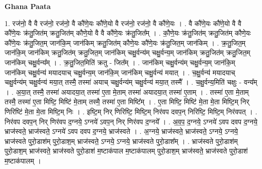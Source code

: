 \documentclass[17pt]{extarticle}
\begin{document}
\textbf{Ghana Paata } \newline

1. रज॑नो॒ वै वै रज॑नो॒ रज॑नो॒ वै कौ॑णे॒यः कौ॑णे॒यो वै रज॑नो॒ रज॑नो॒ वै कौ॑णे॒यः । . वै कौ॑णे॒यः कौ॑णे॒यो वै वै कौ॑णे॒यः क्र॑तु॒जित॑म् क्रतु॒जित॑म् कौणे॒यो वै वै कौ॑णे॒यः क्र॑तु॒जित᳚म् । . कौ॒णे॒यः क्र॑तु॒जित॑म् क्रतु॒जित॑म् कौणे॒यः कौ॑णे॒यः क्र॑तु॒जित॒म् जान॑कि॒म् जान॑किम् क्रतु॒जित॑म् कौणे॒यः कौ॑णे॒यः क्र॑तु॒जित॒म् जान॑किम् । . क्र॒तु॒जित॒म् जान॑कि॒म् जान॑किम् क्रतु॒जित॑म् क्रतु॒जित॒म् जान॑किम् चक्षु॒र्वन्य॑म् चक्षु॒र्वन्य॒म् जान॑किम् क्रतु॒जित॑म् क्रतु॒जित॒म् जान॑किम् चक्षु॒र्वन्य᳚म् । . क्र॒तु॒जित॒मिति॑ क्रतु - जित᳚म् । . जान॑किम् चक्षु॒र्वन्य॑म् चक्षु॒र्वन्य॒म् जान॑कि॒म् जान॑किम् चक्षु॒र्वन्य॑ मयादयाच् चक्षु॒र्वन्य॒म् जान॑कि॒म् जान॑किम् चक्षु॒र्वन्य॑ मयात् । . च॒क्षु॒र्वन्य॑ मयादयाच् चक्षु॒र्वन्य॑म् चक्षु॒र्वन्य॑ मया॒त् तस्मै॒ तस्मा॑ अयाच् चक्षु॒र्वन्य॑म् चक्षु॒र्वन्य॑ मया॒त् तस्मै᳚ । . च॒क्षु॒र्वन्य॒मिति॑ चक्षुः - वन्य᳚म् । . अ॒या॒त् तस्मै॒ तस्मा॑ अयादया॒त् तस्मा॑ ए॒ता मे॒ताम् तस्मा॑ अयादया॒त् तस्मा॑ ए॒ताम् । . तस्मा॑ ए॒ता मे॒ताम् तस्मै॒ तस्मा॑ ए॒ता मिष्टि॒ मिष्टि॑ मे॒ताम् तस्मै॒ तस्मा॑ ए॒ता मिष्टि᳚म् । . ए॒ता मिष्टि॒ मिष्टि॑ मे॒ता मे॒ता मिष्टि॒म् निर् णिरिष्टि॑ मे॒ता मे॒ता मिष्टि॒म् निः । . इष्टि॒म् निर् णिरिष्टि॒ मिष्टि॒म् निर॑वप दवप॒न् निरिष्टि॒ मिष्टि॒म् निर॑वपत् । . निर॑वप दवप॒न् निर् णिर॑वप द॒ग्नये॒ ऽग्नये॑ ऽवप॒न् निर् णिर॑वप द॒ग्नये᳚ । . अ॒व॒प॒ द॒ग्नये॒ ऽग्नये॑ ऽवप दवप द॒ग्नये॒ भ्राज॑स्वते॒ भ्राज॑स्वते॒ ऽग्नये॑ ऽवप दवप द॒ग्नये॒ भ्राज॑स्वते । . अ॒ग्नये॒ भ्राज॑स्वते॒ भ्राज॑स्वते॒ ऽग्नये॒ ऽग्नये॒ भ्राज॑स्वते पुरो॒डाश॑म् पुरो॒डाश॒म् भ्राज॑स्वते॒ ऽग्नये॒ ऽग्नये॒ भ्राज॑स्वते पुरो॒डाश᳚म् । . भ्राज॑स्वते पुरो॒डाश॑म् पुरो॒डाश॒म् भ्राज॑स्वते॒ भ्राज॑स्वते पुरो॒डाश॑ म॒ष्टाक॑पाल म॒ष्टाक॑पालम् पुरो॒डाश॒म् भ्राज॑स्वते॒ भ्राज॑स्वते पुरो॒डाश॑ म॒ष्टाक॑पालम् । \newline
\end{document}
